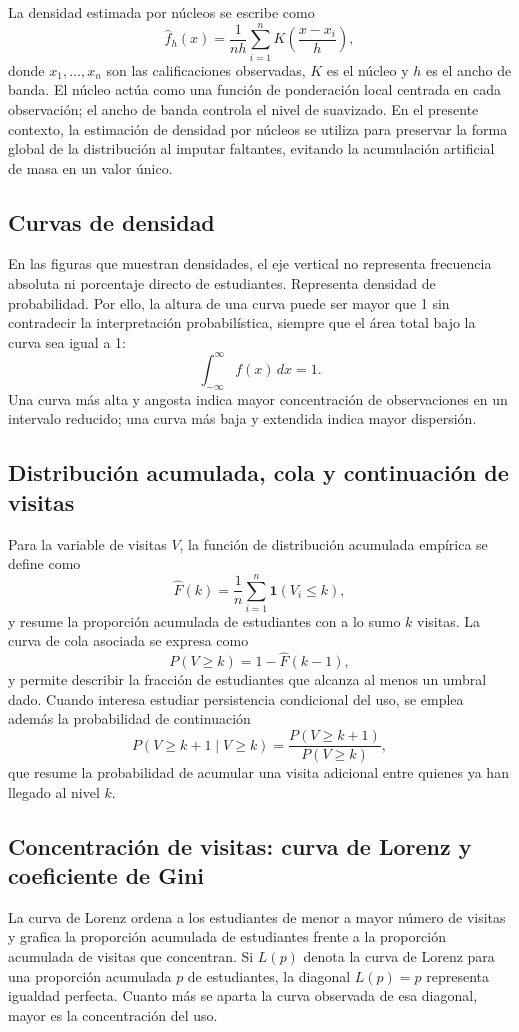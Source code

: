 \documentclass[10pt,letterpaper]{article} %
\numberwithin{figure}{subsection}
\begin{document}
La densidad estimada por núcleos se escribe como
\[
\hat f_h(x)=\frac{1}{nh}\sum_{i=1}^{n}K\!\left(\frac{x-x_i}{h}\right),
\]
donde $x_1,\dots,x_n$ son las calificaciones observadas, $K$ es el núcleo y $h$ es el ancho de banda. El núcleo actúa como una función de ponderación local centrada en cada observación; el ancho de banda controla el nivel de suavizado. En el presente contexto, la estimación de densidad por núcleos se utiliza para preservar la forma global de la distribución al imputar faltantes, evitando la acumulación artificial de masa en un valor único.

\subsection{Curvas de densidad}
En las figuras que muestran densidades, el eje vertical no representa frecuencia absoluta ni porcentaje directo de estudiantes. Representa densidad de probabilidad. Por ello, la altura de una curva puede ser mayor que 1 sin contradecir la interpretación probabilística, siempre que el área total bajo la curva sea igual a 1:
\[
\int_{-\infty}^{\infty} f(x)\,dx = 1.
\]
Una curva más alta y angosta indica mayor concentración de observaciones en un intervalo reducido; una curva más baja y extendida indica mayor dispersión.

\subsection{Distribución acumulada, cola y continuación de visitas}
Para la variable de visitas $V$, la función de distribución acumulada empírica se define como
\[
\hat F(k)=\frac{1}{n}\sum_{i=1}^{n}\mathbf{1}(V_i\leq k),
\]
y resume la proporción acumulada de estudiantes con a lo sumo $k$ visitas. La curva de cola asociada se expresa como
\[
P(V\geq k)=1-\hat F(k-1),
\]
y permite describir la fracción de estudiantes que alcanza al menos un umbral dado. Cuando interesa estudiar persistencia condicional del uso, se emplea además la probabilidad de continuación
\[
P(V\geq k+1 \mid V\geq k)=\frac{P(V\geq k+1)}{P(V\geq k)},
\]
que resume la probabilidad de acumular una visita adicional entre quienes ya han llegado al nivel $k$.

\subsection{Concentración de visitas: curva de Lorenz y coeficiente de Gini}
La curva de Lorenz ordena a los estudiantes de menor a mayor número de visitas y grafica la proporción acumulada de estudiantes frente a la proporción acumulada de visitas que concentran. Si $L(p)$ denota la curva de Lorenz para una proporción acumulada $p$ de estudiantes, la diagonal $L(p)=p$ representa igualdad perfecta. Cuanto más se aparta la curva observada de esa diagonal, mayor es la concentración del uso.
\end{document}
